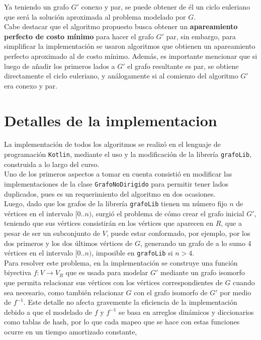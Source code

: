 \documentclass[11pt]{article}
\begin{document}
Ya teniendo un grafo $G'$ conexo y par, se puede obtener de él
un ciclo euleriano que será la solución aproximada al problema 
modelado por $G$. \\

Cabe destacar que el algoritmo propuesto busca obtener un
\textbf{apareamiento perfecto de costo mínimo} para hacer el
grafo $G'$ par, sin embargo, para simplificar la implementación
se usaron algoritmos que obtienen un apareamiento perfecto 
aproximado al de costo mínimo. Además, es importante mencionar
que si luego de añadir los primeros lados a $G'$ el grafo resultante
es par, se obtiene directamente el ciclo euleriano, y análogamente
si al comienzo del algoritmo $G'$ era conexo y par.

\section{Detalles de la implementacion}

La implementación de todos los algoritmos se realizó en el
lenguaje de programación \texttt{Kotlin}, mediante el uso
y la modificación de la librería \texttt{grafoLib}, construida
a lo largo del curso. \\

Uno de los primeros aspectos a tomar en cuenta consistió en
modificar las implementaciones de la clase \texttt{GrafoNoDirigido}
para permitir tener lados duplicados, pues es un requerimiento
del algoritmo en dos ocasiones. \\

Luego, dado que los grafos de la librería \texttt{grafoLib}
tienen un número fijo $n$ de vértices en el intervalo $[0 .. n)$,
surgió el problema de cómo crear el grafo inicial $G'$, teniendo
que sus vértices consistirán en los vértices que aparecen en $R$,
que a pesar de ser un subconjunto de $V$, puede estar conformado,
por ejemplo, por los dos primeros y los dos últimos vértices de
$G$, generando un grafo de a lo sumo 4 vértices en el intervalo 
$[0..n)$, imposible en \texttt{grafoLib} si $n > 4$. \\

Para resolver este problema, en la implementación se construye
una función biyectiva $f: V \rightarrow V_R $ que es usada para
modelar $G'$ mediante un grafo isomorfo que permita relacionar
sus vértices con los vértices correspondientes de $G$
cuando sea necesario, como también relacionar $G$ con el grafo
isomorfo de $G'$ por medio de $f^{-1}$. Este detalle no afecta
gravemente la eficiencia de la implementación debido a que el 
modelado de $f$ y $f^{-1}$ se basa en arreglos dinámicos y 
diccionarios como tablas de hash, por lo que cada mapeo que
se hace con estas funciones ocurre en un tiempo amortizado
constante, \\
\end{document}
